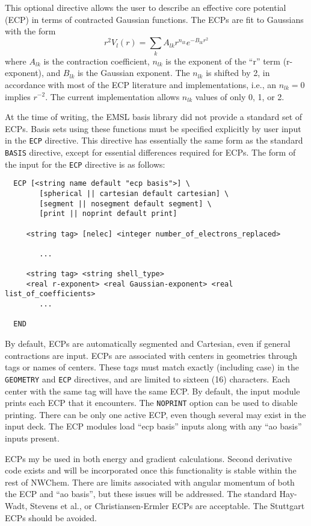 \label{sec:ecp}

This optional directive allows the user to describe an effective core
potential (ECP) in terms of contracted Gaussian functions.  The ECPs
are fit to Gaussians with the form
\[
 r^2V_l(r) = \sum_{k} A_{lk} r^{n_{lk}} e^{-B_{lk}r^{2}}
\]
where $A_{lk}$ is the contraction coefficient, $n_{lk}$ is the
exponent of the ``r'' term (r-exponent), and $B_{lk}$ is the Gaussian
exponent.  The $n_{lk}$ is shifted by 2, in accordance with most of the ECP
literature and implementations, i.e., an $n_{lk} = 0$ implies
$r^{-2}$.  The current implementation allows $n_{lk}$ values
of only 0, 1, or 2. 

At the time of writing, the EMSL basis library did not provide a
standard set of ECPs.  Basis sets using these functions must be
specified explicitly by user input in the \verb+ECP+ directive.  This
directive has essentially the same form as the standard \verb+BASIS+
directive, except for essential differences required for ECPs.  The
form of the input for the \verb+ECP+ directive is as follows:

\begin{verbatim}
  ECP [<string name default "ecp basis">] \
        [spherical || cartesian default cartesian] \
        [segment || nosegment default segment] \
        [print || noprint default print]

     <string tag> [nelec] <integer number_of_electrons_replaced>
 
        ...

     <string tag> <string shell_type>
     <real r-exponent> <real Gaussian-exponent> <real list_of_coefficients>
        ...
     
  END
\end{verbatim}    

By default, ECPs are automatically segmented and Cartesian, even if
general contractions are input.  ECPs are associated with centers in
geometries through tags or names of centers.  These tags must match
exactly (including case) in the \verb+GEOMETRY+ and \verb+ECP+
directives, and are limited to sixteen (16) characters.  Each center
with the same tag will have the same ECP.  By default, the input
module prints each ECP that it encounters.  The \verb+NOPRINT+ option
can be used to disable printing.  There can be only one active ECP,
even though several may exist in the input deck.  The ECP modules load
``ecp basis'' inputs along with any ``ao basis'' inputs present.  

ECPs my be used in both energy and gradient calculations.  Second
derivative code exists and will be incorporated once this
functionality is stable within the rest of NWChem.  There are limits
associated with angular momentum of both the ECP and ``ao basis'', but
these issues will be addressed. The standard Hay-Wadt, Stevens et al.,
or Christiansen-Ermler ECPs are acceptable.  The Stuttgart ECPs should
be avoided.

